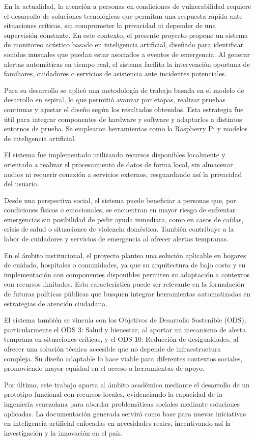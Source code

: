 
En la actualidad, la atención a personas en condiciones de vulnerabilidad requiere el desarrollo de soluciones tecnológicas que permitan una respuesta rápida ante situaciones críticas, sin comprometer la privacidad ni depender de una supervisión constante. En este contexto, el presente proyecto propone un sistema de monitoreo acústico basado en inteligencia artificial, diseñado para identificar sonidos inusuales que puedan estar asociados a eventos de emergencia. Al generar alertas automáticas en tiempo real, el sistema facilita la intervención oportuna de familiares, cuidadores o servicios de asistencia ante incidentes potenciales.

Para su desarrollo se aplicó una metodología de trabajo basada en el modelo de desarrollo en espiral, lo que permitió avanzar por etapas, realizar pruebas continuas y ajustar el diseño según los resultados obtenidos. Esta estrategia fue útil para integrar componentes de hardware y software y adaptarlos a distintos entornos de prueba. Se emplearon herramientas como la Raspberry Pi y modelos de inteligencia artificial.

El sistema fue implementado utilizando recursos disponibles localmente y orientado a realizar el procesamiento de datos de forma local, sin almacenar audios ni requerir conexión a servicios externos, resguardando así la privacidad del usuario.

Desde una perspectiva social, el sistema puede beneficiar a personas que, por condiciones físicas o emocionales, se encuentran en mayor riesgo de enfrentar emergencias sin posibilidad de pedir ayuda inmediata, como en casos de caídas, crisis de salud o situaciones de violencia doméstica. También contribuye a la labor de cuidadores y servicios de emergencia al ofrecer alertas tempranas.

En el ámbito institucional, el proyecto plantea una solución aplicable en hogares de cuidado, hospitales o comunidades, ya que su arquitectura de bajo costo y su implementación con componentes disponibles permiten su adaptación a contextos con recursos limitados. Esta característica puede ser relevante en la formulación de futuras políticas públicas que busquen integrar herramientas automatizadas en estrategias de atención ciudadana.

El sistema también se vincula con los Objetivos de Desarrollo Sostenible (ODS), particularmente el ODS 3: Salud y bienestar, al aportar un mecanismo de alerta temprana en situaciones críticas, y el ODS 10: Reducción de desigualdades, al ofrecer una solución técnica accesible que no depende de infraestructura compleja. Su diseño adaptable lo hace viable para diferentes contextos sociales, promoviendo mayor equidad en el acceso a herramientas de apoyo.

Por último, este trabajo aporta al ámbito académico mediante el desarrollo de un prototipo funcional con recursos locales, evidenciando la capacidad de la ingeniería venezolana para abordar problemáticas sociales mediante soluciones aplicadas. La documentación generada servirá como base para nuevas iniciativas en inteligencia artificial enfocadas en necesidades reales, incentivando así la investigación y la innovación en el país.
